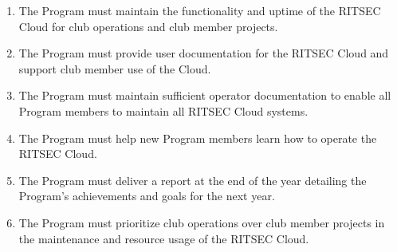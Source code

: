 
\begin{enumerate}
	\item The Program must maintain the functionality and uptime of the RITSEC Cloud for
	      club operations and club member projects.
	\item The Program must provide user documentation for the RITSEC Cloud and support
	      club member use of the Cloud.
	\item The Program must maintain sufficient operator documentation to enable all
	      Program members to maintain all RITSEC Cloud systems.
	\item The Program must help new Program members learn how to operate the RITSEC
	      Cloud.
	\item The Program must deliver a report at the end of the year detailing the
	      Program's achievements and goals for the next year.
	\item The Program must prioritize club operations over club member projects in the
	      maintenance and resource usage of the RITSEC Cloud.
\end{enumerate}
